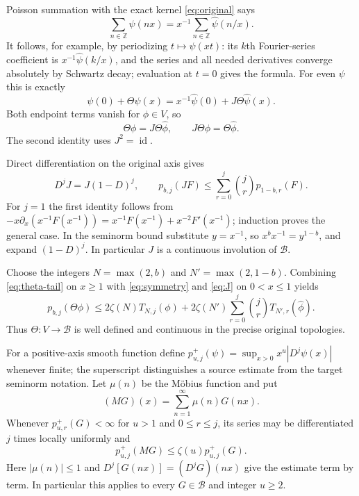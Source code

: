 \documentclass[11pt]{article}
\newcommand{\B}{\mathscr B}
\newcommand{\Z}{\mathbb Z}
\newcommand{\id}{\operatorname{id}}
\begin{document}
Poisson summation with the exact kernel \eqref{eq:original} says
\[
 \sum_{n\in\Z}\psi(nx)
    =x^{-1}\sum_{n\in\Z}\widehat\psi(n/x).
\]
It follows, for example, by periodizing $t\mapsto\psi(xt)$:
its $k$th Fourier-series coefficient is $x^{-1}\widehat\psi(k/x)$,
and the series and all needed derivatives converge absolutely by
Schwartz decay; evaluation at $t=0$ gives the formula.
For even $\psi$ this is exactly
\begin{equation}\label{eq:poisson}
 \psi(0)+\Theta\psi(x)
       =x^{-1}\widehat\psi(0)+J\Theta\widehat\psi(x).
\end{equation}
Both endpoint terms vanish for $\phi\in V$, so
\begin{equation}\label{eq:symmetry}
 \Theta\phi=J\Theta\widehat\phi,
 \qquad J\Theta\phi=\Theta\widehat\phi.
\end{equation}
The second identity uses $J^2=\id$.

Direct differentiation on the original axis gives
\begin{equation}\label{eq:J}
 D^jJ=J(1-D)^j,\qquad
 p_{b,j}(JF)\leq\sum_{r=0}^j\binom jr p_{1-b,r}(F).
\end{equation}
For $j=1$ the first identity follows from
$-x\partial_x(x^{-1}F(x^{-1}))
=x^{-1}F(x^{-1})+x^{-2}F'(x^{-1})$;
induction proves the general case. In the seminorm bound substitute
$y=x^{-1}$, so $x^b x^{-1}=y^{1-b}$, and expand $(1-D)^j$.
In particular $J$ is a continuous involution of $\B$.

Choose the integers $N=\max(2,b)$ and $N'=\max(2,1-b)$.
Combining \eqref{eq:theta-tail} on $x\geq1$ with
\eqref{eq:symmetry} and \eqref{eq:J} on $0<x\leq1$ yields
\begin{equation}\label{eq:theta-continuity}
 p_{b,j}(\Theta\phi)
 \leq2\zeta(N)T_{N,j}(\phi)
  +2\zeta(N')\sum_{r=0}^j\binom jrT_{N',r}(\widehat\phi).
\end{equation}
Thus $\Theta:V\to\B$ is well defined and continuous in the precise
original topologies.

For a positive-axis smooth function define
$p^+_{u,j}(\psi)=\sup_{x>0}x^u|D^j\psi(x)|$ whenever finite;
the superscript distinguishes a source estimate from the target
seminorm notation. Let $\mu(n)$ be the M\"obius function and put
\[
 (MG)(x)=\sum_{n=1}^{\infty}\mu(n)G(nx).
\]
Whenever $p^+_{u,r}(G)<\infty$ for $u>1$ and $0\leq r\leq j$, its
series may be differentiated $j$ times locally uniformly and
\begin{equation}\label{eq:mobius-bound}
 p^+_{u,j}(MG)\leq\zeta(u)p^+_{u,j}(G).
\end{equation}
Here $|\mu(n)|\leq1$ and $D^j[G(nx)]=(D^jG)(nx)$ give the estimate
term by term. In particular this applies to every $G\in\B$ and
integer $u\geq2$.
\end{document}
